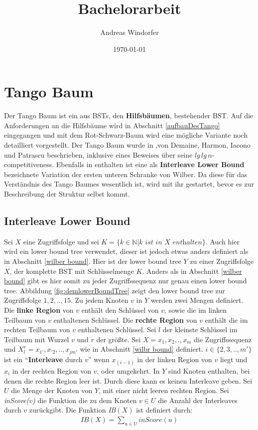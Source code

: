 \documentclass[a4paper,12pt]{article}
\title{Bachelorarbeit}
\author{
Andreas Windorfer\\
}
\date{\today}
\begin{document}
\maketitle
\newpage

\tableofcontents
\newpage

\section{Tango Baum}
Der Tango Baum ist ein aus BSTs, den \textbf{Hilfsbäumen}, bestehender BST. Auf die Anforderungen an die Hilfsbäume wird in Abschnitt \ref{aufbauDesTango} eingegangen und mit dem Rot-Schwarz-Baum wird eine mögliche Variante noch detailliert vorgestellt. Der Tango Baum wurde in \cite{demainDinamicOpti},von Demaine, Harmon, Iacono und Patrascu beschrieben, inklusive eines Beweises über seine $\mathit{lg} \, \mathit{lg} \, n $-competitiveness. Ebenfalls in \cite{demainDinamicOpti} enthalten ist eine als \textbf{Interleave Lower Bound} bezeichnete Variation der ersten unteren Schranke von Wilber. Da diese für das Verständnis des Tango Baumes wesentlich ist, wird mit ihr gestartet, bevor es zur Beschreibung der Struktur selbst kommt. 


\subsection{Interleave Lower Bound} \label{interBound}
  Sei $X$ eine Zugriffsfolge und sei $K = \{k \in \mathbb{N} \vert k \textit{ ist in X enthalten}\}$. Auch hier wird ein lower bound tree verwendet, dieser ist jedoch etwas anders definiert als in Abschnitt \ref{wilber bound}. Hier ist der lower bound tree $Y$ zu einer Zugriffsfolge $X$, der komplette BST mit Schlüsselmenge $K$. Anders als in Abschnitt \ref{wilber bound}  gibt es hier somit zu jeder Zugriffssequenz nur genau einen lower bound tree. Abbildung \ref{fig:demlowerBoundTree} zeigt den lower bound tree zur Zugriffsfolge $1, 2,.., 15$. Zu jedem Knoten $v$ in $Y$ werden zwei Mengen definiert. Die \textbf{linke Region} von $v$ enthält den Schlüssel von $v$, sowie die im linken Teilbaum von $v$ enthaltenen Schlüssel.  Die \textbf{rechte Region} von $v$ enthält die im rechten Teilbaum von $v$ enthaltenen Schlüssel. Sei $l$ der kleinste Schlüssel im Teilbaum mit Wurzel $v$ und $r$ der größte. Sei $X = x_1,x_2,.,x_m$ die Zugriffssequenz und $X^r_l = {x_{1'},x_{'2},..,x_{jm'}}$ wie in Abschnitt \ref{wilbr bound} definiert. $i \in \{2,3,..,m'\}$ ist ein \enquote{\textbf{Interleave} durch $v$} wenn $x_{\left(i -1\right)}$ in der linken Region von $v$ liegt und $x_i$ in der rechten Region von $v$, oder umgekehrt. In $Y$ sind Knoten enthalten, bei denen die rechte Region leer ist. Durch diese kann es keinen Interleave geben. Sei $U$ die Menge der Knoten von $Y$, mit einer nicht leeren rechten Region. Sei \textit{inScore($v$)} die Funktion die zu dem Knoten $v \in U$ die Anzahl der Interleaves durch $v$ zurückgibt.  Die Funktion \textit{IB$\left(X\right)$} ist definiert durch:
\begin{align*}
\mathit{IB}\left(X\right) = \sum_{u \in U} \mathit{inScore}\left(u\right)
\end{align*}
\end{document}
